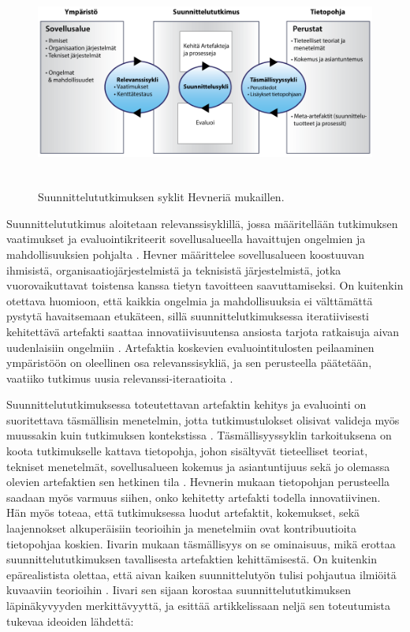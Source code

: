 \documentclass[utf8]{gradu3}
\begin{document}
\begin{figure}[h]\centering
  \includegraphics[height=7cm,keepaspectratio]{DSR}
  \caption{Suunnittelututkimuksen syklit Hevneriä \parencite*{cycles} mukaillen. }
  \label{fig:dsr}
\end{figure} 

Suunnittelututkimus aloitetaan relevanssisyklillä, jossa määritellään tutkimuksen vaatimukset ja evaluointikriteerit sovellusalueella havaittujen ongelmien ja mahdollisuuksien pohjalta \parencite{cycles}. Hevner \parencite*{cycles} määrittelee sovellusalueen koostuuvan ihmisistä, organisaatiojärjestelmistä ja teknisistä järjestelmistä, jotka vuorovaikuttavat toistensa kanssa tietyn tavoitteen saavuttamiseksi. On kuitenkin otettava huomioon, että kaikkia ongelmia ja mahdollisuuksia ei välttämättä pystytä havaitsemaan etukäteen, sillä suunnittelutkimuksessa iteratiivisesti kehitettävä artefakti saattaa innovatiivisuutensa ansiosta tarjota ratkaisuja aivan uudenlaisiin ongelmiin \parencite{pragmatic}. Artefaktia koskevien evaluointitulosten peilaaminen ympäristöön on oleellinen osa relevanssisykliä, ja sen perusteella päätetään, vaatiiko tutkimus uusia relevanssi-iteraatioita \parencite{cycles}. 

Suunnittelututkimuksessa toteutettavan artefaktin kehitys ja evaluointi on suoritettava täsmällisin menetelmin, jotta tutkimustulokset olisivat valideja myös muussakin kuin tutkimuksen kontekstissa \parencite*{hevner2004}. Täsmällisyyssyklin tarkoituksena on koota tutkimukselle kattava tietopohja, johon sisältyvät tieteelliset teoriat, tekniset menetelmät, sovellusalueen kokemus ja asiantuntijuus sekä jo olemassa olevien artefaktien sen hetkinen tila \parencite{cycles}. Hevnerin \parencite*{cycles} mukaan tietopohjan perusteella saadaan myös varmuus siihen, onko kehitetty artefakti todella innovatiivinen. Hän myös toteaa, että tutkimuksessa luodut artefaktit, kokemukset, sekä laajennokset alkuperäisiin teorioihin ja menetelmiin ovat kontribuutioita tietopohjaa koskien. Iivarin mukaan \parencite*{pragmatic} täsmällisyys on se ominaisuus, mikä erottaa suunnittelututkimuksen tavallisesta artefaktien kehittämisestä.  On kuitenkin epärealistista olettaa, että aivan kaiken suunnittelutyön tulisi pohjautua ilmiöitä kuvaaviin teorioihin \parencite{cycles, pragmatic}. Iivari \parencite*{pragmatic} sen sijaan korostaa suunnittelututkimuksen läpinäkyvyyden merkittävyyttä, ja esittää artikkelissaan neljä sen toteutumista tukevaa ideoiden lähdettä:
\end{document}
